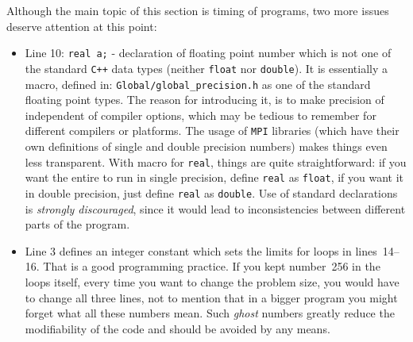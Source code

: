 Although the main topic of this section is timing of {\psiboil} programs,
two more issues deserve attention at this point:
%
\begin{itemize}
  \item Line 10: {\tt real a;} - declaration of floating point number which
        is not one of the standard {\tt C++} data types (neither {\tt float}
        nor {\tt double}). It is essentially a macro, defined in:
        {\tt Global/global\_precision.h} as one of the standard floating
        point types. The reason for introducing it, is to make precision of
        {\psiboil} independent of compiler options, which may be tedious
        to remember for different compilers or platforms. The usage of {\tt MPI}
        libraries (which have their own definitions of single and double precision
        numbers) makes things even less transparent. With macro for {\tt real},
        things are quite straightforward: if you want the entire {\psiboil} 
        to run in single precision, define {\tt real} as {\tt float},
        if you want it in double precision, just define {\tt real} as {\tt double}.
        Use of standard declarations is {\em strongly discouraged}, since it would
        lead to inconsistencies between different parts of the program.
  \item Line 3 defines an integer constant which sets the limits for loops in 
        lines~14--16. That is a good programming practice. If you kept number~256
        in the loops itself, every time you want to change the problem size, you would
        have to change all three lines, not to mention that in a bigger program
        you might forget what all these numbers mean. Such {\em ghost} numbers
        greatly reduce the modifiability of the code and should be avoided by any
        means.
\end{itemize}

